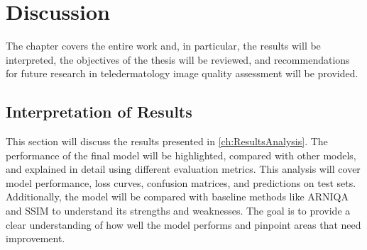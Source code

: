 \chapter{Discussion}
\label{ch:Discussion}
The chapter covers the entire work and, in particular, the results will be interpreted, the objectives of the thesis will be reviewed, and recommendations for future research in teledermatology image quality assessment will be provided. \par

\section{Interpretation of Results}
\label{sec:InterpretationResults}
This section will discuss the results presented in \autoref{ch:ResultsAnalysis}. The performance of the final model will be highlighted, compared with other models, and explained in detail using different evaluation metrics. This analysis will cover model performance, loss curves, confusion matrices, and predictions on test sets. Additionally, the model will be compared with baseline methods like ARNIQA and SSIM to understand its strengths and weaknesses. The goal is to provide a clear understanding of how well the model performs and pinpoint areas that need improvement. \par


